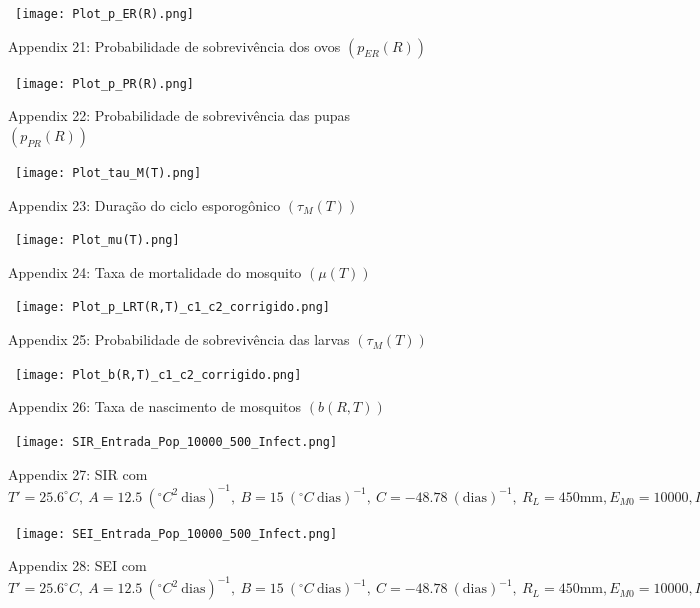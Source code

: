 \documentclass[
	12pt,				%
	oneside,			%
	a4paper,			%
	english,			%
	brazil				%
	]{abntex2}
\begin{document}
\begin{apendicesenv}
\newpage
\begin{figure}[!ht]
	\centering
	\hbox{\hspace{3.0em} \texttt{[image: Plot\_p\_ER(R).png]}}
	\caption*{Appendix 21: Probabilidade de sobrevivência dos ovos $(p_{ER}(R))$} 
\end{figure} 
\begin{figure}[!ht]
	\centering
	\hbox{\hspace{2.5em} \texttt{[image: Plot\_p\_PR(R).png]}}
	\caption*{Appendix 22: Probabilidade de sobrevivência das pupas $(p_{PR}(R))$} 
\end{figure} 
\newpage
\begin{figure}[!ht]
	\centering
	\hbox{\hspace{3.0em} \texttt{[image: Plot\_tau\_M(T).png]}}
	\caption*{Appendix 23: Duração do ciclo esporogônico $(\tau_{M}(T))$} 
\end{figure} 
\begin{figure}[!ht]
	\centering
	\hbox{\hspace{1.0em} \texttt{[image: Plot\_mu(T).png]}}
	\caption*{Appendix 24: Taxa de mortalidade do mosquito $(\mu(T))$} 
\end{figure} 
\newpage
\begin{figure}[!ht]
	\centering
	\hbox{\hspace{3.5em} \texttt{[image: Plot\_p\_LRT(R,T)\_c1\_c2\_corrigido.png]}}
	\caption*{Appendix 25: Probabilidade de sobrevivência das larvas $(\tau_{M}(T))$} 
\end{figure} 
\begin{figure}[!ht]
	\centering
	\hbox{\hspace{3.5em} \texttt{[image: Plot\_b(R,T)\_c1\_c2\_corrigido.png]}}
	\caption*{Appendix 26: Taxa de nascimento de mosquitos $(b(R,T))$} 
\end{figure} 
\newpage
\begin{figure}[!ht]
	\centering
	\hbox{\hspace{2.7em} \texttt{[image: SIR\_Entrada\_Pop\_10000\_500\_Infect.png]}}
	\caption*{Appendix 27: SIR com $T'=25.6^\circ C, \ A=12.5 \ (^\circ C^2 \ \text{dias})^{-1}, \ B=15 \ (^\circ C \ \text{dias})^{-1}, \ C=-48.78 \ (\text{dias})^{-1}, \ R_L=450 \text{mm}, E_{M0}=10000, I_{H0}=500$} 
\end{figure} 
\begin{figure}[!ht]
	\centering
	\hbox{\hspace{2.5em} \texttt{[image: SEI\_Entrada\_Pop\_10000\_500\_Infect.png]}}
	\caption*{Appendix 28: SEI com $T'=25.6^\circ C, \ A=12.5 \ (^\circ C^2 \ \text{dias})^{-1}, \ B=15 \ (^\circ C \ \text{dias})^{-1}, \ C=-48.78 \ (\text{dias})^{-1}, \ R_L=450 \text{mm}, E_{M0}=10000, I_{H0}=500$} 

\end{figure}
\end{apendicesenv}
\end{document}
